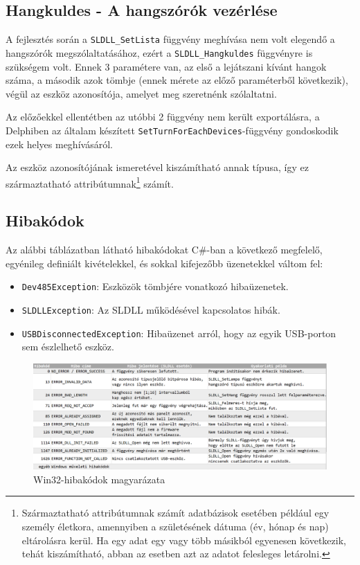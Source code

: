 \documentclass[tocnopagenum]{thesis-ekf}
\begin{document}
	\subsection{Hangkuldes - A hangszórók vezérlése}
	A fejlesztés során a \verb*|SLDLL_SetLista| függvény meghívása nem volt elegendő a hangszórók megszólaltatásához, ezért a \verb*|SLDLL_Hangkuldes| függvényre is szükségem volt. Ennek 3 paramétere van, az első a lejátszani kívánt hangok száma, a második azok tömbje (ennek mérete az előző paraméterből következik), végül az eszköz azonosítója, amelyet meg szeretnénk szólaltatni.
	
	Az előzőekkel ellentétben az utóbbi 2 függvény nem került exportálásra, a Delphiben az általam készített \verb*|SetTurnForEachDevices|-függvény gondoskodik ezek helyes meghívásáról.
	
	Az eszköz azonosítójának ismeretével kiszámítható annak típusa, így ez származtatható attribútumnak\footnote{Származtatható attribútumnak számít adatbázisok esetében például egy személy életkora, amennyiben a születésének dátuma (év, hónap és nap) eltárolásra kerül. Ha egy adat egy vagy több másikból egyenesen következik, tehát kiszámítható, abban az esetben azt az adatot felesleges letárolni.} számít.
	\subsection{Hibakódok}
	Az alábbi táblázatban látható hibakódokat C\#-ban a következő megfelelő, egyénileg definiált kivételekkel, és sokkal kifejezőbb üzenetekkel váltom fel:
	\begin{itemize}
		\item \verb*|Dev485Exception|: Eszközök tömbjére vonatkozó hibaüzenetek.
		\item \verb*|SLDLLException|: Az SLDLL működésével kapcsolatos hibák.
		\item \verb*|USBDisconnectedException|: Hibaüzenet arról, hogy az egyik USB-porton sem észlelhető eszköz.
	\end{itemize}

	\begin{figure}[H]
		\centering
		\hspace*{-0.5in}
		\includegraphics[scale=0.5]{images/errcodes.png}
		\caption[Hibakódok és magyarázataik]{Win32-hibakódok magyarázata}
		\label{fig:errcodes}
	\end{figure}
\end{document}

